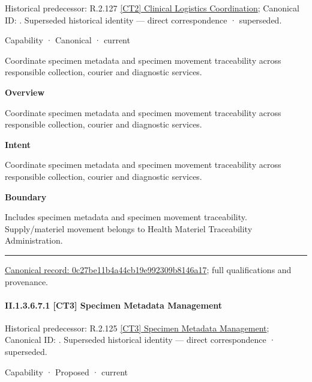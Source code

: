{\small Historical predecessor: R.2.127 \hyperref[element:90a782ff2d004fa984ae0465528b2253]{[CT2] Clinical Logistics Coordination}; Canonical ID: \texttt{}. Superseded historical identity — direct correspondence · superseded.}\par
\label{element:0c27be11b4a44cb19e992309b8146a17}
{\small Capability · Canonical · current}\par

Coordinate specimen metadata and specimen movement traceability across responsible collection, courier and diagnostic services.



\textbf{Overview}



Coordinate specimen metadata and specimen movement traceability across responsible collection, courier and diagnostic services.



\textbf{Intent}



Coordinate specimen metadata and specimen movement traceability across responsible collection, courier and diagnostic services.



\textbf{Boundary}



Includes specimen metadata and specimen movement traceability. Supply/materiel movement belongs to Health Materiel Traceability Administration.



\medskip\hrule\medskip

{\footnotesize \href{../../../../../../../continuum/strategy/capability/0c27be11b4a44cb19e992309b8146a17.md}{Canonical record: 0c27be11b4a44cb19e992309b8146a17}; full qualifications and provenance.}\par
\paragraph*{II.1.3.6.7.1 [CT3] Specimen Metadata Management}
\label{navigation:II.1.3.6.7.1}

{\small Historical predecessor: R.2.125 \hyperref[element:3b000d3712534d16a48470f79df8e33a]{[CT3] Specimen Metadata Management}; Canonical ID: \texttt{}. Superseded historical identity — direct correspondence · superseded.}\par
\label{element:738736425b7446fdae47b06c91c4f69c}
{\small Capability · Proposed · current}\par

